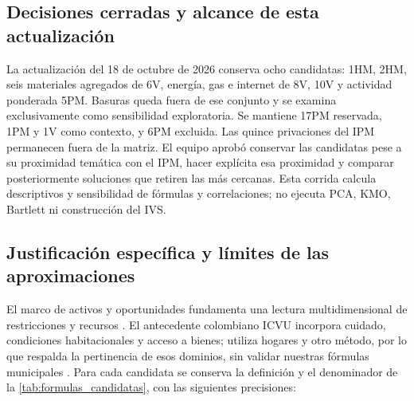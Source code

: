 \subsection{Decisiones cerradas y alcance de esta actualización}

La actualización del 18 de octubre de 2026 conserva ocho candidatas: 1HM, 2HM, seis materiales agregados de 6V, energía, gas e internet de 8V, 10V y actividad ponderada 5PM. Basuras queda fuera de ese conjunto y se examina exclusivamente como sensibilidad exploratoria. Se mantiene 17PM reservada, 1PM y 1V como contexto, y 6PM excluida. Las quince privaciones del IPM permanecen fuera de la matriz. El equipo aprobó conservar las candidatas pese a su proximidad temática con el IPM, hacer explícita esa proximidad y comparar posteriormente soluciones que retiren las más cercanas. Esta corrida calcula descriptivos y sensibilidad de fórmulas y correlaciones; no ejecuta PCA, KMO, Bartlett ni construcción del IVS.

\subsection{Justificación específica y límites de las aproximaciones}

El marco de activos y oportunidades fundamenta una lectura multidimensional de restricciones y recursos \citep{kaztman1999activos,pizarro2001vulnerabilidad}. El antecedente colombiano ICVU incorpora cuidado, condiciones habitacionales y acceso a bienes; utiliza hogares y otro método, por lo que respalda la pertinencia de esos dominios, sin validar nuestras fórmulas municipales \citep{dnp2023icvu}. Para cada candidata se conserva la definición y el denominador de la \cref{tab:formulas_candidatas}, con las siguientes precisiones:

